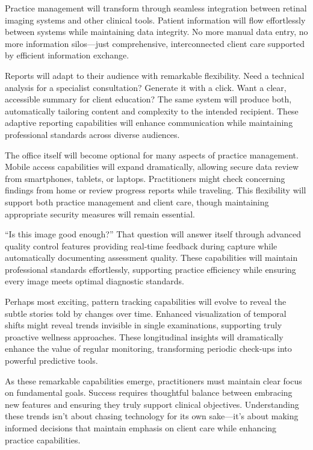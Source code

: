 \documentclass[
  Letterpaper,
]{scrbook}
\begin{document}
Practice management will transform through seamless integration between
retinal imaging systems and other clinical tools. Patient information
will flow effortlessly between systems while maintaining data integrity.
No more manual data entry, no more information silos---just
comprehensive, interconnected client care supported by efficient
information exchange.

Reports will adapt to their audience with remarkable flexibility. Need a
technical analysis for a specialist consultation? Generate it with a
click. Want a clear, accessible summary for client education? The same
system will produce both, automatically tailoring content and complexity
to the intended recipient. These adaptive reporting capabilities will
enhance communication while maintaining professional standards across
diverse audiences.

The office itself will become optional for many aspects of practice
management. Mobile access capabilities will expand dramatically,
allowing secure data review from smartphones, tablets, or laptops.
Practitioners might check concerning findings from home or review
progress reports while traveling. This flexibility will support both
practice management and client care, though maintaining appropriate
security measures will remain essential.

``Is this image good enough?'' That question will answer itself through
advanced quality control features providing real-time feedback during
capture while automatically documenting assessment quality. These
capabilities will maintain professional standards effortlessly,
supporting practice efficiency while ensuring every image meets optimal
diagnostic standards.

Perhaps most exciting, pattern tracking capabilities will evolve to
reveal the subtle stories told by changes over time. Enhanced
visualization of temporal shifts might reveal trends invisible in single
examinations, supporting truly proactive wellness approaches. These
longitudinal insights will dramatically enhance the value of regular
monitoring, transforming periodic check-ups into powerful predictive
tools.

As these remarkable capabilities emerge, practitioners must maintain
clear focus on fundamental goals. Success requires thoughtful balance
between embracing new features and ensuring they truly support clinical
objectives. Understanding these trends isn't about chasing technology
for its own sake---it's about making informed decisions that maintain
emphasis on client care while enhancing practice capabilities.
\end{document}

